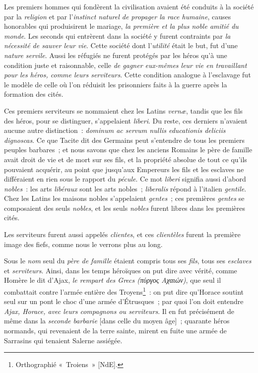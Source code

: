 \documentclass[french,twoside]{book} %
\begin{document}
\noindent Les premiers hommes qui fondèrent la civilisation avaient été conduits à la société par la {\itshape religion} et par l’{\itshape instinct naturel de propager la race humaine}, causes honorables qui produisirent le mariage, {\itshape la première et la plus noble amitié du monde}. Les seconds qui entrèrent dans la société y furent contraints par {\itshape la nécessité de sauver leur vie}. Cette société dont l’{\itshape utilité} était le but, fut d’une {\itshape nature servile}. Aussi les réfugiés ne furent protégés par les héros qu’à une condition juste et raisonnable, celle {\itshape de gagner eux-mêmes leur vie en travaillant pour les héros, comme leurs serviteurs}. Cette condition analogue à l’esclavage fut le modèle de celle où l’on réduisit les prisonniers faits à la guerre après la formation des cités.\par
Ces premiers serviteurs se nommaient chez les Latins {\itshape vernæ}, tandis que les fils des héros, pour se distinguer, s’appelaient {\itshape liberi}. Du reste, ces derniers n’avaient aucune autre distinction : \emph{{\itshape dominum ac servum nullis educationis deliciis dignoscas}}. Ce  que Tacite dit des Germains peut s’entendre de tous les premiers peuples barbares ; et nous savons que chez les anciens Romains le père de famille avait droit de vie et de mort sur ses fils, et la propriété absolue de tout ce qu’ils pouvaient acquérir, au point que jusqu’aux Empereurs les fils et les esclaves ne différaient en rien sous le rapport du {\itshape pécule}. Ce mot {\itshape liberi} signifia aussi d’abord {\itshape nobles} : les arts {\itshape libéraux} sont les arts nobles ; {\itshape liberalis} répond à l’italien {\itshape gentile}. Chez les Latins les maisons nobles s’appelaient {\itshape gentes} ; ces premières {\itshape gentes} se composaient des seuls {\itshape nobles}, et les seuls {\itshape nobles} furent libres dans les premières cités.\par
Les serviteurs furent aussi appelés {\itshape clientes}, et ces {\itshape clientèles} furent la première image des fiefs, comme nous le verrons plus au long.\par
\par
Sous le {\itshape nom} seul du {\itshape père de famille} étaient compris tous ses {\itshape fils}, tous ses {\itshape esclaves} et {\itshape serviteurs}. Ainsi, dans les temps héroïques on put dire avec vérité, comme Homère le dit d’Ajax, \emph{{\itshape le rempart des Grecs} (πύργος Αχαιών)}, que seul il combattait contre l’armée entière des Troyens\footnote{Orthographié « Troiens » [NdE].} : on put dire qu’Horace soutint seul sur un pont le choc d’une armée d’Étrusques ; par quoi l’on doit entendre {\itshape Ajax, Horace, avec leurs compagnons ou serviteurs}. Il en fut précisément de même dans la {\itshape seconde barbarie} [dans celle du moyen âge] ; quarante héros normands, qui revenaient de la terre sainte, mirent en fuite une armée de Sarrasins qui tenaient Salerne assiégée.\par
\end{document}
